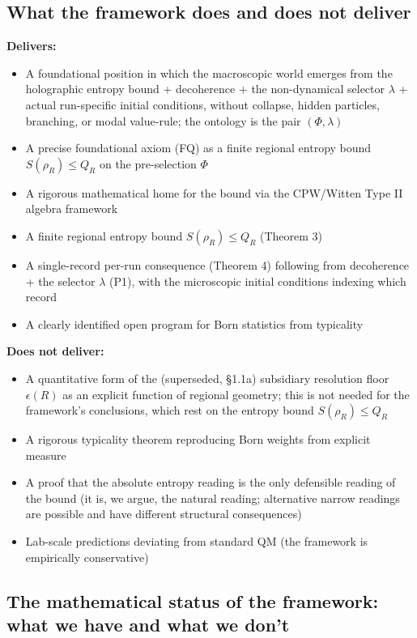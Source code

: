 \documentclass[11pt,a4paper]{article}
\begin{document}
\subsection{What the framework does and does not deliver}

\textbf{Delivers:}
\begin{itemize}
  \item A foundational position in which the macroscopic world emerges from the holographic entropy bound + decoherence + the non-dynamical selector $\lambda$ + actual run-specific initial conditions, without collapse, hidden particles, branching, or modal value-rule; the ontology is the pair $(\Phi,\lambda)$
  \item A precise foundational axiom (FQ) as a finite regional entropy bound $S(\rho_R) \le Q_R$ on the pre-selection $\Phi$
  \item A rigorous mathematical home for the bound via the CPW/Witten Type II algebra framework
  \item A finite regional entropy bound $S(\rho_R) \le Q_R$ (Theorem 3)
  \item A single-record per-run consequence (Theorem 4) following from decoherence + the selector $\lambda$ (P1), with the microscopic initial conditions indexing which record
  \item A clearly identified open program for Born statistics from typicality
\end{itemize}

\textbf{Does not deliver:}
\begin{itemize}
  \item A quantitative form of the (superseded, §1.1a) subsidiary resolution floor $\epsilon(R)$ as an explicit function of regional geometry; this is not needed for the framework's conclusions, which rest on the entropy bound $S(\rho_R) \le Q_R$
  \item A rigorous typicality theorem reproducing Born weights from explicit measure
  \item A proof that the absolute entropy reading is the only defensible reading of the bound (it is, we argue, the natural reading; alternative narrow readings are possible and have different structural consequences)
  \item Lab-scale predictions deviating from standard QM (the framework is empirically conservative)
\end{itemize}

\subsection{The mathematical status of the framework: what we have and what we don't}
\end{document}

